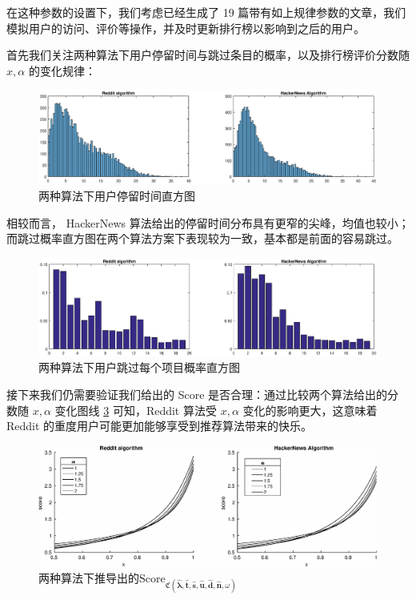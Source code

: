 \documentclass[UTF8]{ctexart}
\theoremstyle{plain}
\theoremstyle{definition}
\theoremstyle{remark}
\begin{document}
	在这种参数的设置下，我们考虑已经生成了 19 篇带有如上规律参数的文章，我们模拟用户的访问、评价等操作，并及时更新排行榜以影响到之后的用户。
	
	首先我们关注两种算法下用户停留时间与跳过条目的概率，以及排行榜评价分数随 $x, \alpha$ 的变化规律：
	
	\begin{figure}[h!]
		\centering
		\includegraphics[width = \linewidth]{../model/douhu/pic/reddit-h-time.eps}
		\caption{两种算法下用户停留时间直方图}\label{fig:reddit-h-time}
	\end{figure}
	
	相较而言， HackerNews 算法给出的停留时间分布具有更窄的尖峰，均值也较小；而跳过概率直方图在两个算法方案下表现较为一致，基本都是前面的容易跳过。
	
	\begin{figure}[h!]
		\centering
		\includegraphics[width = \linewidth]{../model/douhu/pic/reddit-h-skip.eps}
		\caption{两种算法下用户跳过每个项目概率直方图}\label{fig:reddit-h-skip}
	\end{figure}
	
	接下来我们仍需要验证我们给出的 Score 是否合理：通过比较两个算法给出的分数随 $x, \alpha$ 变化图线 \ref{fig:reddit-h-score} 可知，Reddit 算法受 $x, \alpha$ 变化的影响更大，这意味着 Reddit 的重度用户可能更加能够享受到推荐算法带来的快乐。
	
	\begin{figure}[h!]
		\centering
		\includegraphics[width = \linewidth]{../model/douhu/pic/reddit-h-score.eps}
		\caption{两种算法下推导出的$\mathrm{Score}_{\mathfrak{C}\left(\bm{\hat{\lambda}}, \bm{\hat{t}}, \bm{\hat{s}}, \bm{\hat{u}}, \bm{\hat{d}}, \bm{\hat{n}},\omega\right)}$}\label{fig:reddit-h-score}
	\end{figure}
	
\end{document}

